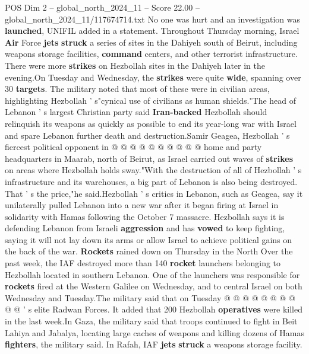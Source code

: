 \begin{textsample}{POS Dim 2 – global\_north\_2024\_11 – Score 22.00 – global\_north\_2024\_11/117674714.txt}
No one was hurt and an investigation was \textbf{launched}, UNIFIL added in a statement.
Throughout Thursday morning, Israel \textbf{Air} Force \textbf{jets} \textbf{struck} a series of sites in the Dahiyeh south of Beirut, including weapons storage facilities, \textbf{command} centers, and other terrorist infrastructure.
There were more \textbf{strikes} on Hezbollah sites in the Dahiyeh later in the evening.On Tuesday and Wednesday, the \textbf{strikes} were quite \textbf{wide}, spanning over 30 \textbf{targets}.
The military noted that most of these were in civilian areas, highlighting Hezbollah ' s"cynical use of civilians as human shields."The head of Lebanon ' s largest Christian party said \textbf{Iran-backed} Hezbollah should relinquish its weapons as quickly as possible to end its year-long war with Israel and spare Lebanon further death and destruction.Samir Geagea, Hezbollah ' s fiercest political opponent in @ @ @ @ @ @ @ @ @ @ home and party headquarters in Maarab, north of Beirut, as Israel carried out waves of \textbf{strikes} on areas where Hezbollah holds sway."With the destruction of all of Hezbollah ' s infrastructure and its warehouses, a big part of Lebanon is also being destroyed.
That ' s the price,"he said.Hezbollah ' s critics in Lebanon, such as Geagea, say it unilaterally pulled Lebanon into a new war after it began firing at Israel in solidarity with Hamas following the October 7 massacre.
Hezbollah says it is defending Lebanon from Israeli \textbf{aggression} and has \textbf{vowed} to keep fighting, saying it will not lay down its arms or allow Israel to achieve political gains on the back of the war. \textbf{Rockets} rained down on Thursday in the North Over the past week, the IAF destroyed more than 140 \textbf{rocket} launchers belonging to Hezbollah located in southern Lebanon.
One of the launchers was responsible for \textbf{rockets} fired at the Western Galilee on Wednesday, and to central Israel on both Wednesday and Tuesday.The military said that on Tuesday @ @ @ @ @ @ @ @ @ @ ' s elite Radwan Forces.
It added that 200 Hezbollah \textbf{operatives} were killed in the last week.In Gaza, the military said that troops continued to fight in Beit Lahiya and Jabalya, locating large caches of weapons and killing dozens of Hamas \textbf{fighters}, the military said.
In Rafah, IAF \textbf{jets} \textbf{struck} a weapons storage facility.

\end{textsample}
